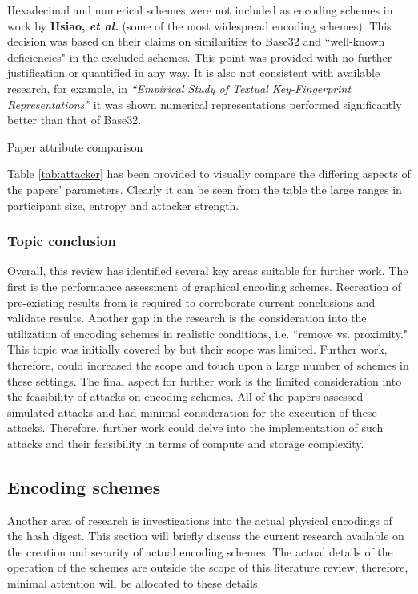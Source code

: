 Hexadecimal and numerical schemes were not included as encoding schemes in work by \textbf{Hsiao, \textit{et al.}}\cite{hsiao2009study} (some of the most widespread encoding schemes). This decision was based on their claims on similarities to Base32 and ``well-known deficiencies" in the excluded schemes. This point was provided with no further justification or quantified in any way. It is also not consistent with available research, for example, in \textit{``Empirical Study of Textual Key-Fingerprint Representations''}\cite{dechand2016empirical} it was shown numerical representations performed significantly better than that of Base32.

\begin{table}[h!]
    \makebox[\textwidth][c]{
        
    }%
    \caption{Paper attribute comparison}
    \label{tab:attacker}
\end{table}

Table \ref{tab:attacker} has been provided to visually compare the differing aspects of the papers' parameters. Clearly it can be seen from the table the large ranges in participant size, entropy and attacker strength.

\subsubsection*{Topic conclusion}
Overall, this review has identified several key areas suitable for further work.
The first is the performance assessment of graphical encoding schemes. Recreation of pre-existing results from \cite{hsiao2009study}\cite{tan2017can} is required to corroborate current conclusions and validate results.
Another gap in the research is the consideration into the utilization of encoding schemes in realistic conditions, i.e. ``remove vs. proximity." This topic was initially covered by \cite{shirvanian2017pitfalls} but their scope was limited. Further work, therefore, could increased the scope and touch upon a large number of schemes in these settings.
The final aspect for further work is the limited consideration into the feasibility of attacks on encoding schemes. All of the papers assessed simulated attacks and had minimal consideration for the execution of these attacks. Therefore, further work could delve into the implementation of such attacks and their feasibility in terms of compute and storage complexity.

\subsection{Encoding schemes}
Another area of research is investigations into the actual physical encodings of the hash digest. This section will briefly discuss the current research available on the creation and security of actual encoding schemes. The actual details of the operation of the schemes are outside the scope of this literature review, therefore, minimal attention will be allocated to these details.

